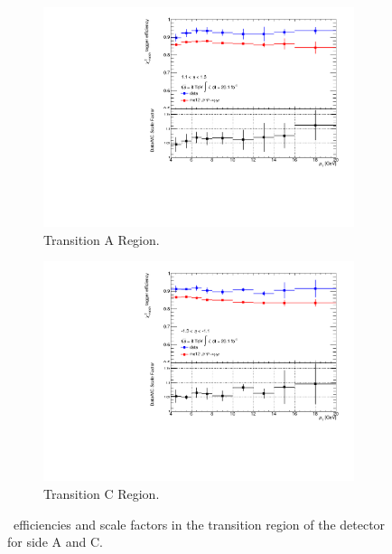 \begin{figure}[htbp]
  \centering
  \begin{subfigure}[b]{0.85\textwidth}
    \includegraphics[width=\textwidth]{PartCalibration2012/Plots/SFPlots/Transition_A_smt.pdf}
    \caption{Transition A Region.}\label{fig:CalibrationScaleFactorTransitionA}
  \end{subfigure}
  
  \begin{subfigure}[b]{0.85\textwidth}
    \includegraphics[width=\textwidth]{PartCalibration2012/Plots/SFPlots/Transition_C_smt.pdf}
    \caption{Transition C Region.}\label{fig:CalibrationScaleFactorTransitionC}
  \end{subfigure}
  \caption[\xsm\ efficiencies and scale factors in the transition region of the detector for side A and C.]{\xsm\ efficiencies and scale factors in the transition region of the detector for side  A and  C.}\label{fig:CalibrationScaleFactorTransition}
\end{figure}

